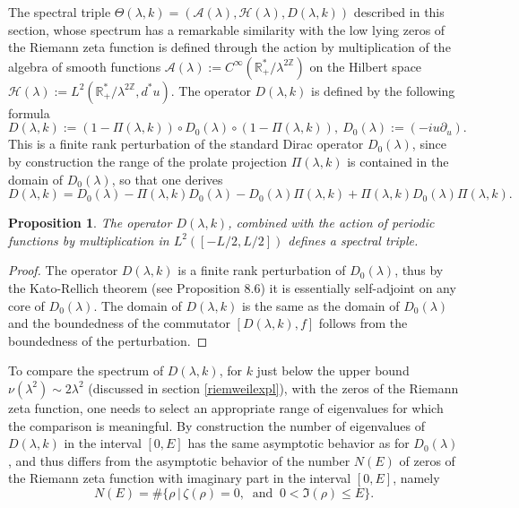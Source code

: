\documentclass[cupthm]{CUP-JNL-JMJ}
\def\R{{\mathbb R}}
\def\Z{{\mathbb Z}}
\def\cA{{\mathcal A}}
\def\cH{{\mathcal H}}
\numberwithin{equation}{section}
\theoremstyle{cupplain}
\newtheorem{proposition}[theorem]{Proposition}
\theoremstyle{cupdefinition}
\theoremstyle{cupremark}
\theoremstyle{cupproof}
\newtheorem{proof}{Proof}
\begin{document}
 The spectral triple $\Theta(\lambda,k)=(\cA(\lambda),\cH(\lambda),D(\lambda,k))$ described in this section, whose spectrum has a remarkable similarity with the low lying zeros of the Riemann zeta function is defined through the action by multiplication of the algebra of smooth functions $\cA(\lambda):=C^{\infty}(\R_+^*/\lambda^{2\Z})$ on the Hilbert space $\cH(\lambda):=L^2(\R_+^*/\lambda^{2\Z},d^*u)$. The operator $D(\lambda,k)$ is defined by the following formula
\begin{equation}\label{iD}
D(\lambda,k):=(1-\Pi(\lambda,k))\circ D_0(\lambda)\circ (1-\Pi(\lambda,k)), \ D_0(\lambda):=(-iu\partial_u).
\end{equation}
This is a finite rank perturbation of the standard Dirac operator $D_0(\lambda)$, since by construction the range of the prolate projection $\Pi(\lambda,k)$ is contained in  the domain of $D_0(\lambda)$,  so that one derives
$$
D(\lambda,k)=D_0(\lambda) -\Pi(\lambda,k)D_0(\lambda)-D_0(\lambda)\Pi(\lambda,k)+\Pi(\lambda,k)D_0(\lambda)\Pi(\lambda,k).
$$
\begin{proposition}\label{propDpert}The operator $D(\lambda,k)$, combined with the action of periodic functions by multiplication in $L^2([-L/2,L/2])$ defines a spectral triple.
\end{proposition}
\begin{proof} The operator $D(\lambda,k)$ is a finite rank perturbation of $D_0(\lambda)$,  thus by the Kato-Rellich theorem (see \cite{schmudgen} Proposition 8.6) it   is essentially self-adjoint on any core of $D_0(\lambda)$. The domain of $D(\lambda,k)$ is the same as the domain of $D_0(\lambda)$ and the boundedness of the commutator $[D(\lambda,k),f]$ follows from the boundedness of the perturbation. 
\end{proof} 
To compare the spectrum of $D(\lambda,k)$, for $k$ just below the upper bound $\nu(\lambda^2)\sim 2\lambda^2$ (discussed in section \ref{riemweilexpl}), with the zeros of the Riemann zeta function, one needs to select an appropriate range  of eigenvalues for which the comparison is meaningful. By construction the number of eigenvalues of $D(\lambda,k)$ in the interval $[0,E]$ has the same asymptotic behavior as for $D_0(\lambda)$, and thus differs from the asymptotic behavior of the number $N(E)$   of zeros of the Riemann zeta function with imaginary part in the interval $[0,E]$, namely
\begin{equation}
N(E) =\# \{ \rho \, | \,  \zeta(\rho)=0, \ \text{ and } \ 0<
\Im(\rho)\leq E \}. \label{ri1}
\end{equation}
\end{document}
